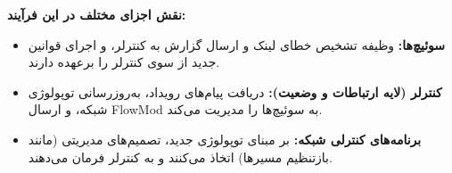 \textbf{نقش اجزای مختلف در این فرآیند:}

\begin{itemize}
	\item \textbf{سوئیچ‌ها:} وظیفه تشخیص خطای لینک و ارسال گزارش به کنترلر، و اجرای قوانین جدید از سوی کنترلر را برعهده دارند.
	
	\item \textbf{کنترلر (لایه ارتباطات و وضعیت):} دریافت پیام‌های رویداد، به‌روزرسانی توپولوژی شبکه، و ارسال FlowMod به سوئیچ‌ها را مدیریت می‌کند.
	
	\item \textbf{برنامه‌های کنترلی شبکه:} بر مبنای توپولوژی جدید، تصمیم‌های مدیریتی (مانند بازتنظیم مسیرها) اتخاذ می‌کنند و به کنترلر فرمان می‌دهند.
\end{itemize}


